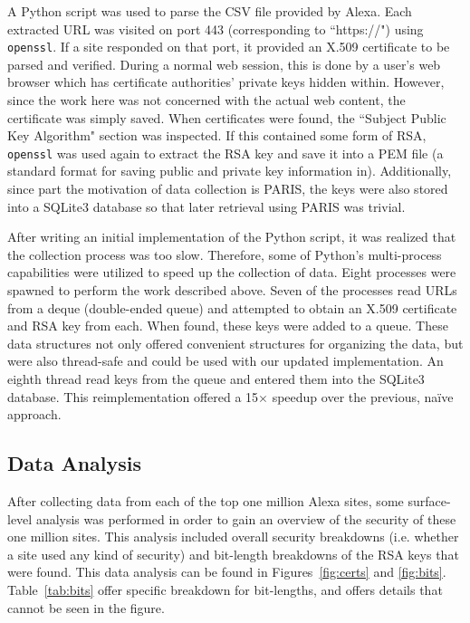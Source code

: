 \documentclass[smallextended]{svjour3}       %
\begin{document}
A Python script was used to parse the CSV file provided by Alexa. Each
extracted URL was visited on port 443 (corresponding to ``https://") using 
\texttt{openssl}. If a site responded on that port, it provided an X.509
certificate to be parsed and verified. During a normal web session, this is
done by a user's web browser which has certificate authorities' private keys
hidden within. However, since the work here was not concerned with the actual
web content, the certificate was simply saved. When certificates were found,
the ``Subject Public Key Algorithm" section was inspected. If this contained
some form of RSA, \texttt{openssl} was used again to extract the RSA key and
save it into a PEM file (a standard format for saving public and private key
information in). Additionally, since part the motivation of data collection is
PARIS, the keys were also stored into a SQLite3 database so that later
retrieval using PARIS was trivial.  

After writing an initial implementation of the Python script, it was realized
that the collection process was too slow. Therefore, some of Python's
multi-process capabilities were utilized to speed up the collection of data.
Eight processes were spawned to perform the work described above. Seven of the
processes read URLs from a deque (double-ended queue) and attempted to obtain
an X.509 certificate and RSA key from each. When found, these keys were added
to a queue. These data structures not only offered convenient structures for
organizing the data, but were also thread-safe and could be used with our
updated implementation. An eighth thread read keys from the queue and entered
them into the SQLite3 database. This reimplementation offered a 15$\times$
speedup over the previous, na\"{i}ve approach.

\subsection{Data Analysis}
\label{subsec:datanalysis}
After collecting data from each of the top one million Alexa sites, some
surface-level analysis was performed in order to gain an overview of the
security of these one million sites. This analysis included overall security
breakdowns (i.e. whether a site used any kind of security) and
bit-length breakdowns of the RSA keys that were found. This data analysis can
be found in Figures~\ref{fig:certs} and \ref{fig:bits}. Table~\ref{tab:bits}
offer specific breakdown for bit-lengths, and offers details that cannot be
seen in the figure.
\end{document}
